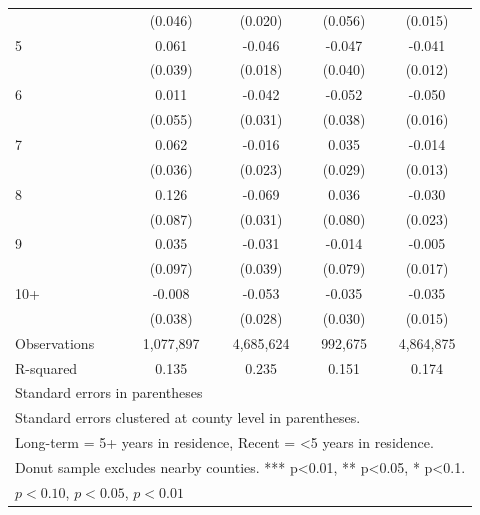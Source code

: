 \begin{table}[htbp]
\begin{tabular}{l*{4}{c}}
            &     (0.046)         &     (0.020)         &     (0.056)         &     (0.015)         \\
[1em]
5           &       0.061         &      -0.046\sym{***}&      -0.047         &      -0.041\sym{***}\\
            &     (0.039)         &     (0.018)         &     (0.040)         &     (0.012)         \\
[1em]
6           &       0.011         &      -0.042         &      -0.052         &      -0.050\sym{***}\\
            &     (0.055)         &     (0.031)         &     (0.038)         &     (0.016)         \\
[1em]
7           &       0.062\sym{*}  &      -0.016         &       0.035         &      -0.014         \\
            &     (0.036)         &     (0.023)         &     (0.029)         &     (0.013)         \\
[1em]
8           &       0.126         &      -0.069\sym{**} &       0.036         &      -0.030         \\
            &     (0.087)         &     (0.031)         &     (0.080)         &     (0.023)         \\
[1em]
9           &       0.035         &      -0.031         &      -0.014         &      -0.005         \\
            &     (0.097)         &     (0.039)         &     (0.079)         &     (0.017)         \\
[1em]
10+         &      -0.008         &      -0.053\sym{*}  &      -0.035         &      -0.035\sym{**} \\
            &     (0.038)         &     (0.028)         &     (0.030)         &     (0.015)         \\
\hline
Observations&   1,077,897         &   4,685,624         &     992,675         &   4,864,875         \\
R-squared   &       0.135         &       0.235         &       0.151         &       0.174         \\
\hline\hline
\multicolumn{5}{l}{\footnotesize Standard errors in parentheses}\\
\multicolumn{5}{l}{\footnotesize Standard errors clustered at county level in parentheses.}\\
\multicolumn{5}{l}{\footnotesize Long-term = 5+ years in residence, Recent = <5 years in residence.}\\
\multicolumn{5}{l}{\footnotesize Donut sample excludes nearby counties. *** p<0.01, ** p<0.05, * p<0.1.}\\
\multicolumn{5}{l}{\footnotesize \sym{*} \(p<0.10\), \sym{**} \(p<0.05\), \sym{***} \(p<0.01\)}\\
\end{tabular}
\end{table}
